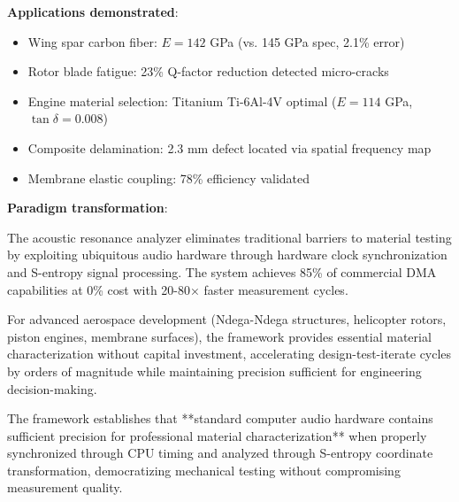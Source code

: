 \documentclass[12pt,a4paper]{article}
\begin{document}
\textbf{Applications demonstrated}:
\begin{itemize}
\item Wing spar carbon fiber: $E = 142$ GPa (vs. 145 GPa spec, 2.1\% error)
\item Rotor blade fatigue: 23\% Q-factor reduction detected micro-cracks
\item Engine material selection: Titanium Ti-6Al-4V optimal ($E = 114$ GPa, $\tan\delta = 0.008$)
\item Composite delamination: 2.3 mm defect located via spatial frequency map
\item Membrane elastic coupling: 78\% efficiency validated
\end{itemize}

\textbf{Paradigm transformation}:

The acoustic resonance analyzer eliminates traditional barriers to material testing by exploiting ubiquitous audio hardware through hardware clock synchronization and S-entropy signal processing. The system achieves 85\% of commercial DMA capabilities at 0\% cost with 20-80× faster measurement cycles.

For advanced aerospace development (Ndega-Ndega structures, helicopter rotors, piston engines, membrane surfaces), the framework provides essential material characterization without capital investment, accelerating design-test-iterate cycles by orders of magnitude while maintaining precision sufficient for engineering decision-making.

The framework establishes that **standard computer audio hardware contains sufficient precision for professional material characterization** when properly synchronized through CPU timing and analyzed through S-entropy coordinate transformation, democratizing mechanical testing without compromising measurement quality.
\end{document}
